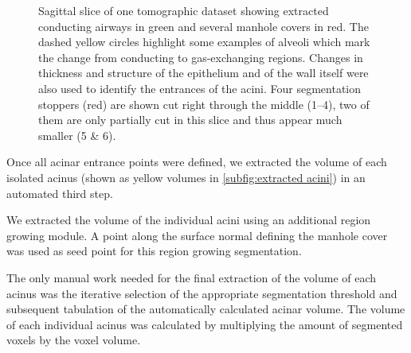 \documentclass[paper=a4,twocolumn=true,DIV=calc,abstract,english]{scrartcl}
\newlength\imagescale		%
\begin{document}
\begin{figure}[htb]
%
	\caption{Sagittal slice of one tomographic dataset showing extracted conducting airways in green and several manhole covers in red.
		The dashed yellow circles highlight some examples of alveoli which mark the change from conducting to gas-exchanging regions.
		Changes in thickness and structure of the epithelium and of the wall itself were also used to identify the entrances of the acini.
		Four segmentation stoppers (red) are shown cut right through the middle (\numrange{1}{4}), two of them are only partially cut in this slice and thus appear much smaller (5 \& 6).}
	\label{fig:ManholeCoverExplanation}
\end{figure}

Once all acinar entrance points were defined, we extracted the volume of each isolated acinus (shown as yellow volumes in \autoref{subfig:extracted acini}) in an automated third step.

We extracted the volume of the individual acini using an additional region growing module.
A point along the surface normal defining the manhole cover was used as seed point for this region growing segmentation.

The only manual work needed for the final extraction of the volume of each acinus was the iterative selection of the appropriate segmentation threshold and subsequent tabulation of the automatically calculated acinar volume. The volume of each individual acinus was calculated by multiplying the amount of segmented voxels by the voxel volume.
\end{document}
